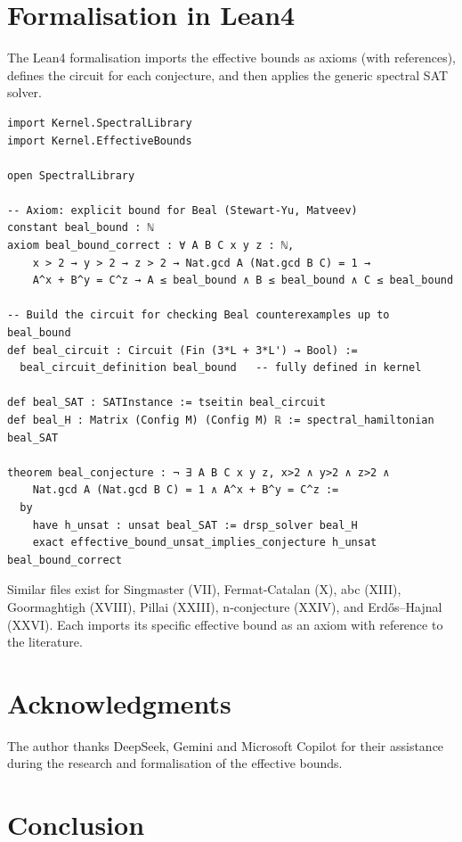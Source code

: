 \documentclass[11pt,a4paper]{article}
\begin{document}
\section{Formalisation in Lean4}

The Lean4 formalisation imports the effective bounds as axioms (with references), defines the circuit for each conjecture, and then applies the generic spectral SAT solver.

\begin{lstlisting}[style=lean, caption={SeriesIII/BealEffectiveBound.lean (excerpt)}]
import Kernel.SpectralLibrary
import Kernel.EffectiveBounds

open SpectralLibrary

-- Axiom: explicit bound for Beal (Stewart‑Yu, Matveev)
constant beal_bound : ℕ
axiom beal_bound_correct : ∀ A B C x y z : ℕ,
    x > 2 → y > 2 → z > 2 → Nat.gcd A (Nat.gcd B C) = 1 →
    A^x + B^y = C^z → A ≤ beal_bound ∧ B ≤ beal_bound ∧ C ≤ beal_bound

-- Build the circuit for checking Beal counterexamples up to beal_bound
def beal_circuit : Circuit (Fin (3*L + 3*L') → Bool) :=
  beal_circuit_definition beal_bound   -- fully defined in kernel

def beal_SAT : SATInstance := tseitin beal_circuit
def beal_H : Matrix (Config M) (Config M) ℝ := spectral_hamiltonian beal_SAT

theorem beal_conjecture : ¬ ∃ A B C x y z, x>2 ∧ y>2 ∧ z>2 ∧
    Nat.gcd A (Nat.gcd B C) = 1 ∧ A^x + B^y = C^z :=
  by
    have h_unsat : unsat beal_SAT := drsp_solver beal_H
    exact effective_bound_unsat_implies_conjecture h_unsat beal_bound_correct
\end{lstlisting}

Similar files exist for Singmaster (VII), Fermat‑Catalan (X), abc (XIII), Goormaghtigh (XVIII), Pillai (XXIII), n‑conjecture (XXIV), and Erdős–Hajnal (XXVI). Each imports its specific effective bound as an axiom with reference to the literature.

\section{Acknowledgments}

The author thanks DeepSeek, Gemini and Microsoft Copilot for their assistance during the research and formalisation of the effective bounds.

\section{Conclusion}
\end{document}
